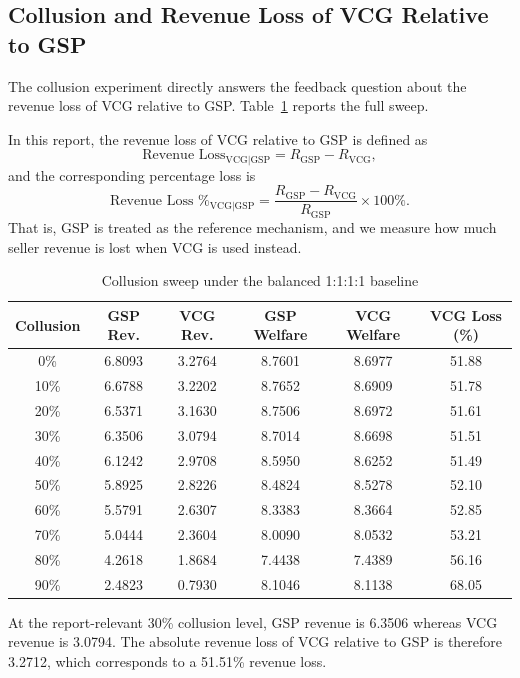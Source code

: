 \documentclass[12pt,a4paper]{article}
\begin{document}
\subsection{Collusion and Revenue Loss of VCG Relative to GSP}

The collusion experiment directly answers the feedback question about the revenue loss of VCG relative to GSP. Table~\ref{tab:collusion} reports the full sweep.

In this report, the revenue loss of VCG relative to GSP is defined as
\[
\text{Revenue Loss}_{\text{VCG}\mid\text{GSP}} = R_{\text{GSP}} - R_{\text{VCG}},
\]
and the corresponding percentage loss is
\[
\text{Revenue Loss \%}_{\text{VCG}\mid\text{GSP}} =
\frac{R_{\text{GSP}} - R_{\text{VCG}}}{R_{\text{GSP}}}\times 100\%.
\]
That is, GSP is treated as the reference mechanism, and we measure how much seller revenue is lost when VCG is used instead.

\begin{table}[t]
  \centering
  \caption{Collusion sweep under the balanced 1:1:1:1 baseline}
  \label{tab:collusion}
  \small
  \begin{tabular}{cccccc}
    \toprule
    Collusion & GSP Rev. & VCG Rev. & GSP Welfare & VCG Welfare & VCG Loss (\%) \\
    \midrule
    0\% & 6.8093 & 3.2764 & 8.7601 & 8.6977 & 51.88 \\
    10\% & 6.6788 & 3.2202 & 8.7652 & 8.6909 & 51.78 \\
    20\% & 6.5371 & 3.1630 & 8.7506 & 8.6972 & 51.61 \\
    30\% & 6.3506 & 3.0794 & 8.7014 & 8.6698 & 51.51 \\
    40\% & 6.1242 & 2.9708 & 8.5950 & 8.6252 & 51.49 \\
    50\% & 5.8925 & 2.8226 & 8.4824 & 8.5278 & 52.10 \\
    60\% & 5.5791 & 2.6307 & 8.3383 & 8.3664 & 52.85 \\
    70\% & 5.0444 & 2.3604 & 8.0090 & 8.0532 & 53.21 \\
    80\% & 4.2618 & 1.8684 & 7.4438 & 7.4389 & 56.16 \\
    90\% & 2.4823 & 0.7930 & 8.1046 & 8.1138 & 68.05 \\
    \bottomrule
  \end{tabular}
\end{table}

At the report-relevant 30\% collusion level, GSP revenue is 6.3506 whereas VCG revenue is 3.0794. The absolute revenue loss of VCG relative to GSP is therefore 3.2712, which corresponds to a 51.51\% revenue loss.
\end{document}
